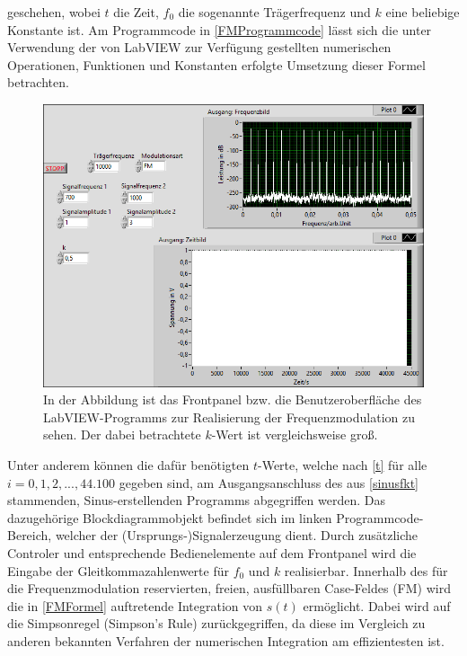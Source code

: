 \documentclass[
a4paper,
12pt,
pagesize,
ngerman
]{scrartcl}
\begin{document}
	\noindent geschehen, wobei $t$ die Zeit, $f_0$ die sogenannte Trägerfrequenz und $k$ eine beliebige Konstante ist. 
	Am Programmcode in \cref{FMProgrammcode} lässt sich die unter Verwendung der von LabVIEW zur Verfügung gestellten numerischen Operationen, Funktionen und Konstanten erfolgte Umsetzung dieser Formel betrachten. 
	
	\begin{figure}[H]
		\centering
		\includegraphics[width=1.0\textwidth]{EIRE2018Dateien/Tag4/FMPM-Erzeugung/anderekbei10000Traegerfr/FM-FMPM-Erzeugungp}
		\caption{In der Abbildung ist das Frontpanel bzw. die Benutzeroberfläche des LabVIEW-Programms zur Realisierung der Frequenzmodulation zu sehen. Der dabei betrachtete $k$-Wert ist vergleichsweise groß.}
		\label{FMAusgabegrossesk}
	\end{figure}
	
	\noindent Unter anderem können die dafür benötigten $t$-Werte, welche nach \cref{t} für alle $i = 0,1,2,...,44.100$ gegeben sind, am Ausgangsanschluss des aus \cref{sinusfkt} stammenden, Sinus-erstellenden Programms abgegriffen werden. 
	Das dazugehörige Blockdiagrammobjekt befindet sich im linken Programmcode-Bereich, welcher der (Ursprungs-)Signalerzeugung dient. 
	Durch zusätzliche Controler und entsprechende Bedienelemente auf dem Frontpanel wird die Eingabe der Gleitkommazahlenwerte für $f_0$ und $k$ realisierbar. 
	Innerhalb des für die Frequenzmodulation reservierten, freien, ausfüllbaren Case-Feldes (\glqq FM\grqq) wird die in \cref{FMFormel} auftretende Integration von $s(t)$ ermöglicht. 
	Dabei wird auf die Simpsonregel (\glqq Simpson's Rule\grqq ) zurückgegriffen, da diese im Vergleich zu anderen bekannten Verfahren der numerischen Integration am effizientesten ist. 
	
\end{document}
